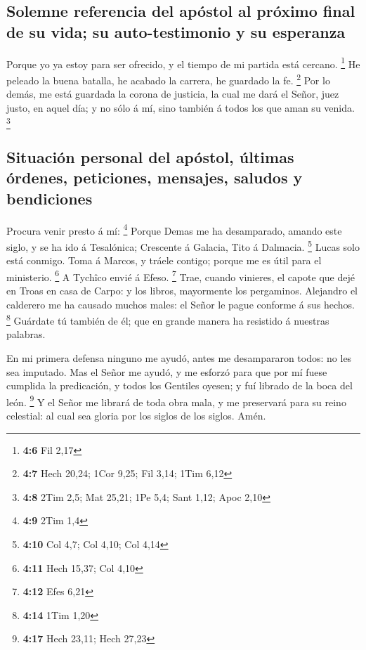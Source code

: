 \hypertarget{solemne-referencia-del-apuxf3stol-al-pruxf3ximo-final-de-su-vida-su-auto-testimonio-y-su-esperanza}{%
\subsection{Solemne referencia del apóstol al próximo final de su vida;
su auto-testimonio y su
esperanza}\label{solemne-referencia-del-apuxf3stol-al-pruxf3ximo-final-de-su-vida-su-auto-testimonio-y-su-esperanza}}

 Porque yo ya estoy para ser ofrecido, y el tiempo de mi
partida está cercano. \footnote{\textbf{4:6} Fil 2,17}  He
peleado la buena batalla, he acabado la carrera, he guardado la fe.
\footnote{\textbf{4:7} Hech 20,24; 1Cor 9,25; Fil 3,14; 1Tim 6,12}
 Por lo demás, me está guardada la corona de justicia, la
cual me dará el Señor, juez justo, en aquel día; y no sólo á mí, sino
también á todos los que aman su venida. \footnote{\textbf{4:8} 2Tim 2,5;
  Mat 25,21; 1Pe 5,4; Sant 1,12; Apoc 2,10}

\hypertarget{situaciuxf3n-personal-del-apuxf3stol-uxfaltimas-uxf3rdenes-peticiones-mensajes-saludos-y-bendiciones}{%
\subsection{Situación personal del apóstol, últimas órdenes, peticiones,
mensajes, saludos y
bendiciones}\label{situaciuxf3n-personal-del-apuxf3stol-uxfaltimas-uxf3rdenes-peticiones-mensajes-saludos-y-bendiciones}}

 Procura venir presto á mí: \footnote{\textbf{4:9} 2Tim
  1,4}  Porque Demas me ha desamparado, amando este
siglo, y se ha ido á Tesalónica; Crescente á Galacia, Tito á Dalmacia.
\footnote{\textbf{4:10} Col 4,7; Col 4,10; Col 4,14} 
Lucas solo está conmigo. Toma á Marcos, y tráele contigo; porque me es
útil para el ministerio. \footnote{\textbf{4:11} Hech 15,37; Col 4,10}
 A Tychîco envié á Efeso. \footnote{\textbf{4:12} Efes
  6,21}  Trae, cuando vinieres, el capote que dejé en
Troas en casa de Carpo: y los libros, mayormente los pergaminos.
 Alejandro el calderero me ha causado muchos males: el
Señor le pague conforme á sus hechos. \footnote{\textbf{4:14} 1Tim 1,20}
 Guárdate tú también de él; que en grande manera ha
resistido á nuestras palabras.

 En mi primera defensa ninguno me ayudó, antes me
desampararon todos: no les sea imputado.  Mas el Señor me
ayudó, y me esforzó para que por mí fuese cumplida la predicación, y
todos los Gentiles oyesen; y fuí librado de la boca del león.
\footnote{\textbf{4:17} Hech 23,11; Hech 27,23}  Y el
Señor me librará de toda obra mala, y me preservará para su reino
celestial: al cual sea gloria por los siglos de los siglos. Amén.

